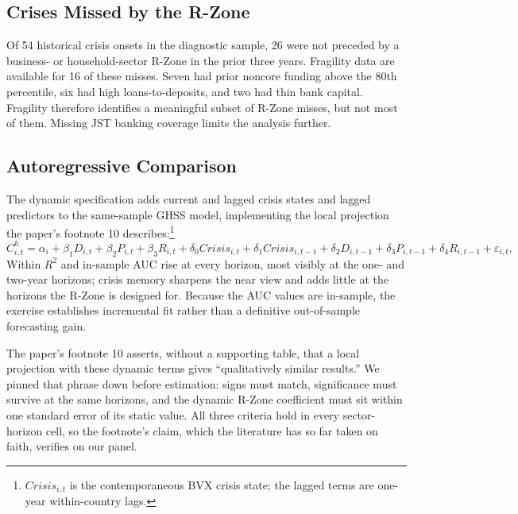 \documentclass[11pt]{article}
\begin{document}
\subsection{Crises Missed by the R-Zone}

Of 54 historical crisis onsets in the diagnostic sample, 26 were not
preceded by a business- or household-sector R-Zone in the prior three years.
Fragility data are available for 16 of these misses. Seven had prior noncore
funding above the 80th percentile, six had high loans-to-deposits, and two
had thin bank capital. Fragility therefore identifies a meaningful subset of
R-Zone misses, but not most of them. Missing JST banking coverage limits the
analysis further.



\subsection{Autoregressive Comparison}

The dynamic specification adds current and lagged crisis states and lagged
predictors to the same-sample GHSS model, implementing the local projection
the paper's footnote 10 describes:\footnote{$\mathit{Crisis}_{i,t}$ is the
contemporaneous BVX crisis state; the lagged terms are one-year
within-country lags.}
\begin{equation}
\label{eq:dynamic}
C^{h}_{i,t} = \alpha_i + \beta_1 D_{i,t} + \beta_2 P_{i,t} + \beta_3 R_{i,t}
+ \delta_0 \mathit{Crisis}_{i,t} + \delta_1 \mathit{Crisis}_{i,t-1}
+ \delta_2 D_{i,t-1} + \delta_3 P_{i,t-1} + \delta_4 R_{i,t-1}
+ \varepsilon_{i,t}.
\end{equation}
Within $R^2$ and in-sample AUC rise at
every horizon, most visibly at the one- and two-year horizons; crisis memory
sharpens the near view and adds little at the horizons the R-Zone is designed
for. Because the AUC values are in-sample, the exercise establishes
incremental fit rather than a definitive out-of-sample forecasting gain.

The paper's footnote 10 asserts, without a supporting table, that a local
projection with these dynamic terms gives ``qualitatively similar results.''
We pinned that phrase down before estimation: signs must match,
significance must survive at the same horizons, and the dynamic R-Zone
coefficient must sit within one standard error of its static value. All three
criteria hold in every sector-horizon cell, so the footnote's claim, which
the literature has so far taken on faith, verifies on our panel.
\end{document}

